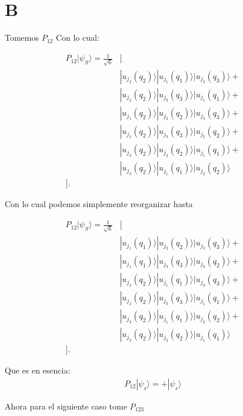 \documentclass{report}
\begin{document}
\section{B}

Tomemos $P_{12}$ Con lo cual:

\begin{align*}
P_{12}| \psi_S \rangle = \frac{1}{\sqrt{6}} &[\\
&| u_{j_2}(q_2) \rangle | u_{j_1}(q_1) \rangle | u_{j_3}(q_3) \rangle +\\
&| u_{j_2}(q_2) \rangle | u_{j_3}(q_3) \rangle | u_{j_1}(q_1) \rangle +\\
&| u_{j_1}(q_2) \rangle | u_{j_2}(q_2) \rangle | u_{j_3}(q_3) \rangle +\\
&| u_{j_1}(q_2) \rangle | u_{j_3}(q_3) \rangle | u_{j_2}(q_2) \rangle +\\
&| u_{j_3}(q_2) \rangle | u_{j_2}(q_2) \rangle | u_{j_1}(q_1) \rangle +\\
&| u_{j_3}(q_2) \rangle | u_{j_1}(q_1) \rangle | u_{j_2}(q_2) \rangle\\
].
\end{align*}

Con lo cual podemos simplemente reorganizar hasta

\begin{align*}
P_{12} | \psi_S \rangle = \frac{1}{\sqrt{6}} &[\\
&| u_{j_1}(q_1) \rangle | u_{j_2}(q_2) \rangle | u_{j_3}(q_3) \rangle +\\
&| u_{j_1}(q_1) \rangle | u_{j_3}(q_3) \rangle | u_{j_2}(q_2) \rangle +\\
&| u_{j_2}(q_2) \rangle | u_{j_1}(q_1) \rangle | u_{j_3}(q_3) \rangle +\\
&| u_{j_2}(q_2) \rangle | u_{j_3}(q_3) \rangle | u_{j_1}(q_1) \rangle +\\
&| u_{j_3}(q_2) \rangle | u_{j_1}(q_1) \rangle | u_{j_2}(q_2) \rangle +\\
&| u_{j_3}(q_2) \rangle | u_{j_2}(q_2) \rangle | u_{j_1}(q_1) \rangle\\
].
\end{align*}

Que es en esencia:
\begin{align*}
  P_{12} | \psi_s \rangle = + | \psi_s \rangle
\end{align*}

Ahora para el siguiente caso tome $P_{123}$
\end{document}
